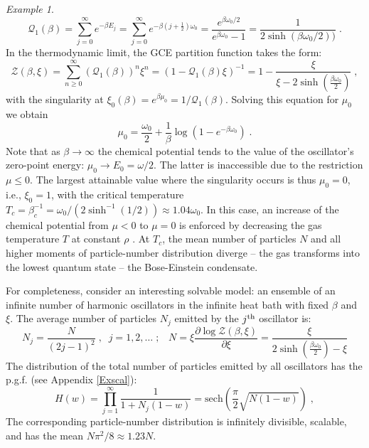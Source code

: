 \documentclass[a4paper,12pt]{amsart}
\theoremstyle{definition}
\theoremstyle{remark}
\newtheorem{Example}{Example}[section]
\begin{document}
\begin{Example}
\begin{equation}\label{hosc}
\mathcal{Q}_1(\beta)=\sum_{j=0}^{\infty} e^{-\beta E_j} = \sum_{j=0}^{\infty} e^{-\beta (j+\frac{1}{2})\omega_0}
 =\frac{e^{\beta\omega_0/2}}{e^{\beta\omega_0}-1}
 = \frac{1}{2\sinh(\beta\omega_0/2))}\;.     
 \end{equation}
In the thermodynamic limit, the GCE partition function takes the form:
\begin{equation}\label{Zqharm} 
\mathcal{Z}(\beta,\xi)=\sum_{n\geq0}^{\infty}(\mathcal{Q}_1(\beta))^n\xi^n=
(1-\mathcal{Q}_1(\beta)\xi)^{-1}=1-\frac{\xi }{\xi -2 \sinh \left(\frac{\beta \omega_0}{2}\right)}\;,
\end{equation}
with the singularity at 
$\xi_0(\beta)=e^{\beta \mu_0}=1/\mathcal{Q}_1(\beta)$. 
Solving this equation for $\mu_0$ we obtain
\[
\mu_0
=\frac{\omega_0}{2} +\frac{1}{\beta} \log(1 - e^{-\beta \omega_0})\;.
\] 
Note that as $\beta\to \infty$ the chemical potential tends to the value of the oscillator's zero-point energy: $\mu_0\to E_0=\omega/2$. 
The latter is inaccessible due to the restriction $\mu\leq 0$. The largest attainable value where the singularity occurs  is thus $\mu_0=0$, i.e., $\xi_0=1$, with the critical temperature
$T_c=\beta_c^{-1}=\omega_0/(2 \sinh ^{-1}(1/2))\approx 1.04\omega_0$. In this case, an increase of the chemical potential from $\mu<0$ to $\mu=0$ is enforced by decreasing the gas temperature $T$ at constant $\rho$ \cite{Lanlif}.  At $T_c$, the mean number of particles $N$ and all higher moments of particle-number distribution diverge -- the gas transforms into the lowest quantum state -- the Bose-Einstein condensate.  
 
For completeness, consider an interesting solvable model: an ensemble of an infinite number of harmonic oscillators in the infinite heat bath with fixed $\beta$ and $\xi$. The average number of particles $N_j$ emitted by the $j^{\rm th}$ oscillator is:
\[
N_j =\frac{N}{(2j-1)^{2}}\;,\;\; j=1,2,\ldots\;;\;\;\;N=
\xi\frac{\partial\log\mathcal{Z}(\beta, \xi)}{\partial\xi}=
\frac{\xi }{2 \sinh \left(\frac{\beta \omega_0}{2}\right)-\xi}
\]
The distribution of the total number of particles emitted by all oscillators has the p.g.f. (see  Appendix \ref{Exscal}):
\begin{equation}\label{inf_many_osc}
 H(w) = \prod_{j=1}^{\infty} \frac{1}{1+N_j(1-w)}
=\text{sech}\left(\frac{\pi}{2}\sqrt{N(1-w)}\right)\;,   
\end{equation}
The corresponding particle-number distribution is infinitely divisible, scalable, and has the mean  $N\pi^2/8\approx 1.23N$.


\end{Example}
\end{document}
